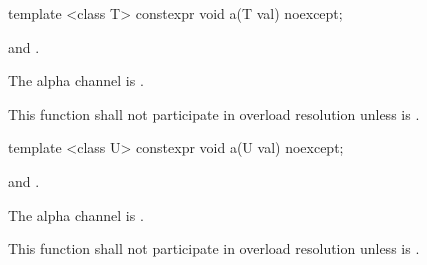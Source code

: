 %
\begin{itemdecl}
template <class T>
constexpr void a(T val) noexcept;
\end{itemdecl}
\begin{itemdescr}
\pnum
\requires
{} and .

\pnum
\effects
The alpha channel is .

\pnum
\remarks
This function shall not participate in overload resolution unless  is .
\end{itemdescr}

%
\begin{itemdecl}
template <class U>
constexpr void a(U val) noexcept;
\end{itemdecl}
\begin{itemdescr}
\pnum
\requires
{} and .

\pnum
\effects
The alpha channel is .

\pnum
\remarks
This function shall not participate in overload resolution unless  is .
\end{itemdescr}

